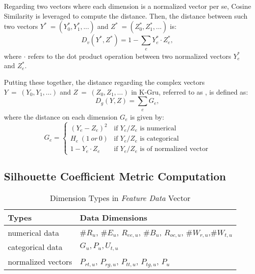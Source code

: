 Regarding two vectors where each dimension is a normalized vector per se, Cosine Similarity is leveraged to compute the distance.
Then, the distance between such two vectors $Y^{\ast}\ = (Y^{\ast}_0, Y^{\ast}_1, ...)$ and $Z^{\ast}\ = (Z^{\ast}_0, Z^{\ast}_1, ...)$ is:
%
\begin{equation}
\label{eq:vd}
D_v(Y^{\ast}, Z^{\ast}) = 1- \sum_{\substack{e}} Y^{\ast}_e \cdot Z^{\ast}_e,
\end{equation}
where $\cdot$ refers to the dot product operation between two normalized vectors $Y^{\ast}_e$ and $Z^{\ast}_e$.

Putting these together, the distance regarding the complex vectors $Y\ =\ (Y_0, Y_1, ...)$ and $Z\ =\ (Z_0, Z_1, ...)$ in K-Gru, referred to as \gd{}, is defined as:
%
\begin{equation}
\label{eq:gd}
D_g(Y, Z) = \sum_{\substack{e}} G_e,
\end{equation}
where the distance on each dimension $G_e$ is given by:
%
\begin{equation}
\label{eq:ge}
G_e =
  \begin{cases}
    (Y_e - Z_e)^2       &  \text{if } Y_e/Z_e \text{ is numerical}\\
    H_e\ (1\ or\ 0)       	&  \text{if } Y_e/Z_e \text{ is categorical}\\
    1 - Y_e \cdot Z_e  		&  \text{if } Y_e/Z_e \text{ is of normalized vector}
  \end{cases}
\end{equation}


\subsection{Silhouette Coefficient Metric Computation}
\label{sec:compu}


\begin{table}[tb!]
\centering
\begin{small}
\caption{Dimension Types in \textit{Feature Data} Vector}
\label{tbl:data-type}
\begin{tabular}{ll}
\toprule
\multicolumn{1}{l}{\textbf{Types}} & \multicolumn{1}{l}{\textbf{Data Dimensions}}	\\	\midrule \midrule
numerical data				& $\#R_u$, $\#E_u$, $R_{ee,u}$, $\#B_u$, $R_{oc,u}$, $\#W_{r,u}$,$\#W_{t,u}$               \\	\midrule 				
categorical data			& $G_u, P_u, U_{t,u}$				\\	\midrule
normalized vectors			& $P_{rt,u}$, $P_{rg,u}$, $P_{tt,u}$, $P_{tg,u}$, $P_u$			\\ \bottomrule
\end{tabular}
\end{small}
\end{table}

